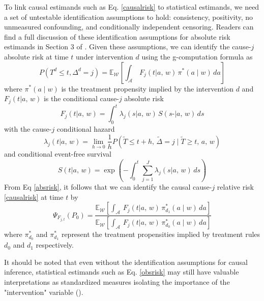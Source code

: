 \documentclass{report}
\newcommand{\1}{\ensuremath{\mathbf{1}}}
\newcommand{\T}{\ensuremath{\widetilde{T}}}
\newcommand{\ax}{\ensuremath{\mid a,\,{w}}}
\newcommand{\x}{\ensuremath{{w}}}
\newcommand{\g}{\ensuremath{\pi}}
\renewcommand{\L}{\ensuremath{W}}
\renewcommand{\l}{\ensuremath{w}}
\newcommand{\tDelta}{\ensuremath{\widetilde{\Delta}}}
\begin{document}
To link causal estimands such as Eq. \eqref{causalrisk} to statistical estimands, we need a set of untestable identification assumptions to hold: consistency, positivity, no unmeasured confounding, and conditionally independent censoring. Readers can find a full discussion of these identification assumptions for absolute risk estimands in Section 3 of \cite{rytgaard_continuous-time_2021}. Given these assumptions, we can identify the cause-\(j\) absolute risk at time \(t\) under intervention \(d\) using the g-computation formula as
\begin{equation}
P(T^d \leq t, \Delta^d = j) = \mathbb{E}_{\mathcal{\L}} \left[ \int_{\mathcal{A}} \,  F_j(t \ax) \, \g^* (a \mid \l) \, da \right] \label{absrisk}
\end{equation}
where \(\g^*(a \mid \l)\) is the treatment propensity implied by the intervention \(d\) and \(F_j(t \ax)\) is the conditional cause-\(j\) absolute risk
\begin{equation*}
F_j(t \ax) = \int_0^t \lambda_j(s \ax) \, S(s\texttt{-} \ax) \, ds 
\end{equation*}
with the cause-\(j\) conditional hazard
\begin{equation*}
\lambda_j(t \ax) = \lim\limits_{h \to 0} \frac{1}{h} P(\T \leq t + h,\, \tDelta = j \mid \T \geq t,\, a,\, \x)
\end{equation*}
and conditional event-free survival
\begin{equation}
S(t \ax) = \exp\left(-\int^{t}_{0} \sum\limits_{j=1}^{J} \lambda_j(s \ax) \, ds \right) \label{evfreesurv}
\end{equation}
From Eq \eqref{absrisk}, it follows that we can identify the causal cause-\(j\) relative risk \eqref{causalrisk} at time \(t\) by
\begin{equation}
\Psi_{F_{j,t}}(P_0) = \frac{\mathbb{E}_{\mathcal{\L}} \left[ \int_{\mathcal{A}} \,  F_j(t \ax) \, \g^*_{d_1} (a \mid \l) \, da \right]}{\mathbb{E}_{\mathcal{\L}} \left[ \int_{\mathcal{A}} \,  F_j(t \ax) \, \g^*_{d_0} (a \mid \l) \, da \right]} \label{obsrisk}
\end{equation}
where \(\g^*_{d_0}\) and \(\g^*_{d_1}\) represent the treatment propensities implied by treatment rules \(d_0\) and \(d_1\) respectively.

It should be noted that even without the identification assumptions for causal inference, statistical estimands such as Eq. \eqref{obsrisk} may still have valuable interpretations as standardized measures isolating the importance of the "intervention" variable (\cite{laan_statistical_2006}).
\end{document}

